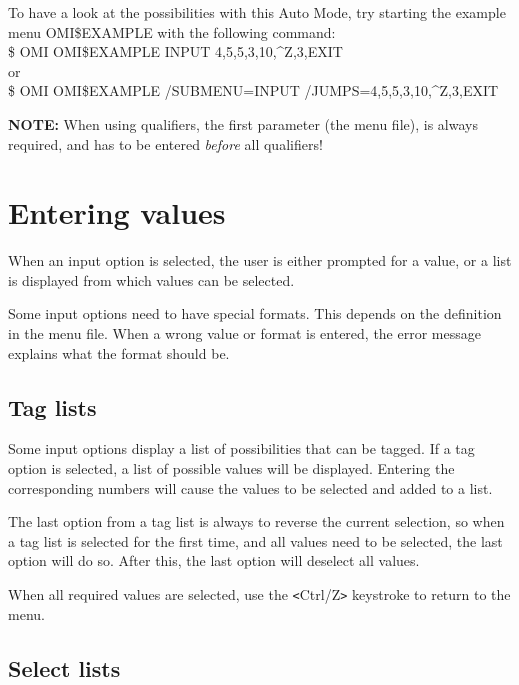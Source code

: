 \documentclass[a4paper]{book}
\newcommand{\vs}{\vspace{3mm}}
\newcommand{\lt}{\texttt{<}}
\newcommand{\gt}{\texttt{>}}
\renewcommand{\indent}{\hspace*{5mm}}
\begin{document}
To have a look at the possibilities with this Auto Mode, try starting the 
example menu OMI{\$}EXAMPLE with the following command:\\
\indent\textsf{{\$} OMI OMI{\$}EXAMPLE INPUT 4,5,5,3,10,\^{}Z,3,EXIT} \\
or \\
\indent\textsf{{\$} OMI OMI{\$}EXAMPLE /SUBMENU=INPUT /JUMPS=4,5,5,3,10,\^{}Z,3,EXIT}

\vs

\hspace{-8mm}\textbf{NOTE:} When using qualifiers, the first parameter (the menu file), 
is always required, and has to be entered \textit{before} all qualifiers!

\section{Entering values}
\label{subsec:entering}

When an input option is selected, the user is either prompted for a value, 
or a list is displayed from which values can be selected.

Some input options need to have special formats. This depends on the 
definition in the menu file. When a wrong value or format is entered, the 
error message explains what the format should be.

\subsection{Tag lists}
\label{subsubsec:mylabel11}

Some input options display a list of possibilities that can be tagged. If a 
tag option is selected, a list of possible values will be displayed. 
Entering the corresponding numbers will cause the values to be selected and 
added to a list.

\vs

The last option from a tag list is always to reverse the current selection, 
so when a tag list is selected for the first time, and all values need to be 
selected, the last option will do so. After this, the last option will 
deselect all values.

When all required values are selected, use the \lt Ctrl/Z\gt{} keystroke to return 
to the menu.

\subsection{Select lists}
\label{subsubsec:select}
\end{document}
